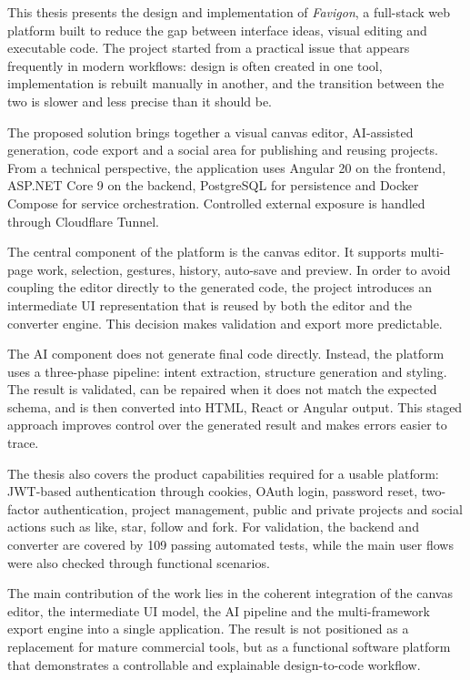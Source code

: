 This thesis presents the design and implementation of \textit{Favigon}, a full-stack web platform built to reduce the gap between interface ideas, visual editing and executable code. The project started from a practical issue that appears frequently in modern workflows: design is often created in one tool, implementation is rebuilt manually in another, and the transition between the two is slower and less precise than it should be.

The proposed solution brings together a visual canvas editor, AI-assisted generation, code export and a social area for publishing and reusing projects. From a technical perspective, the application uses Angular 20 on the frontend, ASP.NET Core 9 on the backend, PostgreSQL for persistence and Docker Compose for service orchestration. Controlled external exposure is handled through Cloudflare Tunnel.

The central component of the platform is the canvas editor. It supports multi-page work, selection, gestures, history, auto-save and preview. In order to avoid coupling the editor directly to the generated code, the project introduces an intermediate UI representation that is reused by both the editor and the converter engine. This decision makes validation and export more predictable.

The AI component does not generate final code directly. Instead, the platform uses a three-phase pipeline: intent extraction, structure generation and styling. The result is validated, can be repaired when it does not match the expected schema, and is then converted into HTML, React or Angular output. This staged approach improves control over the generated result and makes errors easier to trace.

The thesis also covers the product capabilities required for a usable platform: JWT-based authentication through cookies, OAuth login, password reset, two-factor authentication, project management, public and private projects and social actions such as like, star, follow and fork. For validation, the backend and converter are covered by 109 passing automated tests, while the main user flows were also checked through functional scenarios.

The main contribution of the work lies in the coherent integration of the canvas editor, the intermediate UI model, the AI pipeline and the multi-framework export engine into a single application. The result is not positioned as a replacement for mature commercial tools, but as a functional software platform that demonstrates a controllable and explainable design-to-code workflow.
